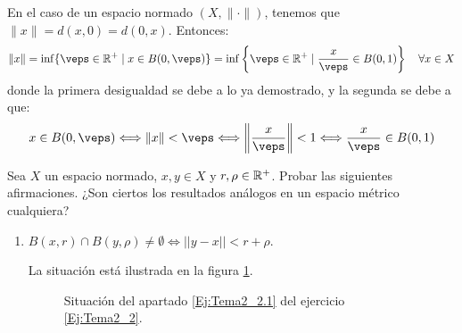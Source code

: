 \begin{ejercicio}
    \noindent
    En el caso de un espacio normado $(X, \|\cdot \|)$, tenemos que $\|x\|=d(x,0)=d(0,x)$. Entonces:
    \begin{equation*}
        \|x\|=\inf \{\veps\in \bb{R}^+\mid x\in B(0,\veps)\}=\inf \left\{\veps\in \bb{R}^+\mid \frac{x}{\veps}\in B(0,1)\right\}    \quad \forall x\in X
    \end{equation*}
    donde la primera desigualdad se debe a lo ya demostrado, y la segunda se debe a que:
    \begin{equation*}
        x\in B(0,\veps)\Longleftrightarrow \|x\|<\veps \Longleftrightarrow \left\|\frac{x}{\veps}\right\|<1 \Longleftrightarrow \frac{x}{\veps}\in B(0,1)
    \end{equation*}
\end{ejercicio}


\begin{ejercicio}\label{Ej:Tema2_2}
    Sea $X$ un espacio normado, $x,y\in X$ y $r,\rho\in \mathbb{R}^+$. Probar las siguientes afirmaciones. ¿Son ciertos los resultados análogos en un espacio métrico cualquiera?
    \begin{enumerate}
        \item $B(x,r)\cap B(y,\rho)\neq \emptyset \Longleftrightarrow ||y-x|| <r+\rho$. \label{Ej:Tema2_2.1}
        
        La situación está ilustrada en la figura \ref{fig:Ej:Tema2_2.1}.
        \begin{figure}
            \centering
            \caption{Situación del apartado \ref{Ej:Tema2_2.1} del ejercicio \ref{Ej:Tema2_2}.}
            \label{fig:Ej:Tema2_2.1}
        \end{figure}


\end{enumerate}
\end{ejercicio}
